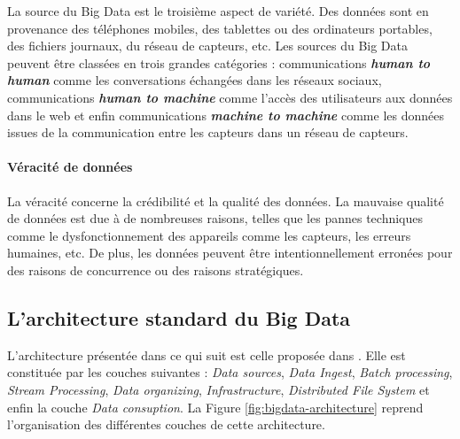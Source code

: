 		La source du Big Data est le troisième aspect de  variété. Des données sont en provenance des téléphones mobiles, des tablettes ou des ordinateurs portables, des fichiers journaux, du réseau de capteurs, etc. Les sources du Big Data peuvent être classées en trois grandes catégories : communications \textbf{\textit{human to human}} comme les conversations échangées dans les réseaux sociaux, communications \textbf{\textit{ human to machine}} comme l'accès des utilisateurs aux données dans le web et enfin communications \textbf{\textit{machine to machine}} comme les données issues de la communication entre les capteurs dans un réseau de capteurs.
		
		
		
		\paragraph{Véracité de données}
		
		La véracité concerne la crédibilité et la qualité des données. La mauvaise qualité de données est due à de nombreuses raisons, telles que les pannes techniques comme le dysfonctionnement des appareils comme les capteurs, les erreurs humaines,  etc. De plus, les données peuvent être intentionnellement erronées pour des raisons de concurrence ou des raisons stratégiques.
	
		\subsection{L'architecture standard du Big Data}
		
		L'architecture présentée dans ce qui suit est celle proposée dans  \cite{anil-big-data}. Elle est constituée par les couches suivantes :  \textit{Data sources}, \textit{Data Ingest}, \textit{Batch processing}, \textit{Stream Processing}, \textit{Data organizing}, \textit{Infrastructure}, \textit{Distributed File System} et enfin la couche \textit{Data consuption}. 
		 La Figure \ref{fig:bigdata-architecture} reprend l'organisation des différentes couches de cette architecture.
		

